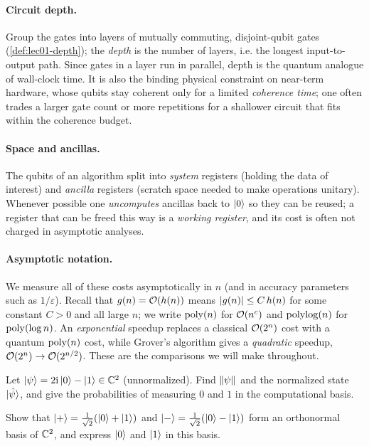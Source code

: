 \paragraph{Circuit depth.} Group the gates into layers of mutually commuting,
disjoint-qubit gates (\cref{def:lec01-depth}); the \emph{depth} is the number of
layers, i.e. the longest input-to-output path. Since gates in a layer run in
parallel, depth is the quantum analogue of wall-clock time. It is also the binding
physical constraint on near-term hardware, whose qubits stay coherent only for a
limited \emph{coherence time}; one often trades a larger gate count or more
repetitions for a shallower circuit that fits within the coherence budget.

\paragraph{Space and ancillas.} The qubits of an algorithm split into \emph{system}
registers (holding the data of interest) and \emph{ancilla} registers (scratch space
needed to make operations unitary). Whenever possible one \emph{uncomputes} ancillas
back to $\ket{0}$ so they can be reused; a register that can be freed this way is a
\emph{working register}, and its cost is often not charged in asymptotic analyses.

\paragraph{Asymptotic notation.} We measure all of these costs asymptotically in $n$
(and in accuracy parameters such as $1/\varepsilon$). Recall that $g(n)=\mathcal{O}(h(n))$
means $\left\lvert g(n) \right\rvert\le C\,h(n)$ for some constant $C>0$ and all large $n$; we write
$\operatorname{poly}(n)$ for $\mathcal{O}(n^{c})$ and $\operatorname{polylog}(n)$ for $\operatorname{poly}(\log n)$. An
\emph{exponential} speedup replaces a classical $\mathcal{O}(2^{n})$ cost with a quantum
$\operatorname{poly}(n)$ cost, while Grover's algorithm gives a \emph{quadratic} speedup,
$\mathcal{O}(2^{n})\to\mathcal{O}(2^{n/2})$. These are the comparisons we will make throughout.

\exercisesection
\begin{exercise}\label{ex:lec01-1}
Let $\ket{\psi}=2\mathrm{i}\ket{0}-\ket{1}\in\mathbb{C}^{2}$ (unnormalized). Find $\left\lVert \psi \right\rVert$ and
the normalized state $\ket{\hat\psi}$, and give the probabilities of measuring $0$
and $1$ in the computational basis.
\end{exercise}

\begin{exercise}\label{ex:lec01-2}
Show that $\ket{+}=\tfrac{1}{\sqrt2}(\ket{0}+\ket{1})$ and
$\ket{-}=\tfrac{1}{\sqrt2}(\ket{0}-\ket{1})$ form an orthonormal basis of $\mathbb{C}^{2}$,
and express $\ket{0}$ and $\ket{1}$ in this basis.
\end{exercise}

